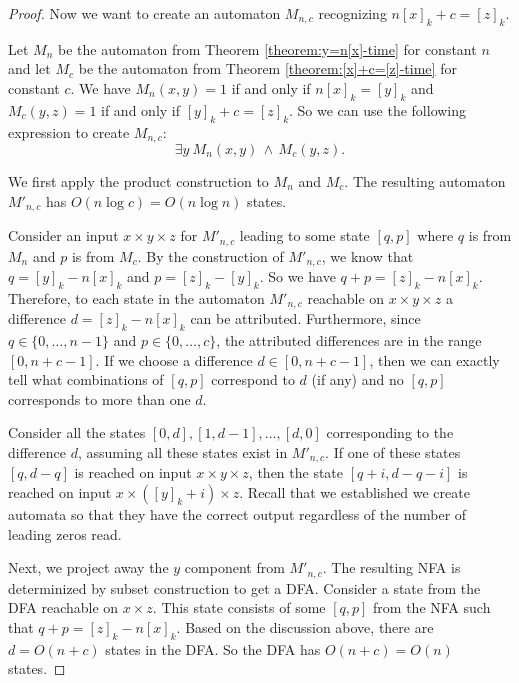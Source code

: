 \documentclass[12pt,reqno]{article}
\def\AND{\, \wedge \,}
\begin{document}
\begin{proof}
Now we want to create an automaton $M_{n, c}$ recognizing $n[x]_k + c = [z]_k$.

Let $M_n$ be the automaton from Theorem \ref{theorem:y=n[x]-time} for constant $n$ and let $M_c$ be the automaton from Theorem \ref{theorem:[x]+c=[z]-time} for constant $c$.
We have $M_n(x, y)=1$ if and only if $n[x]_k = [y]_k$ and $M_c(y, z)=1$ if and only if $[y]_k + c = [z]_k$. So we can use the following expression to create $M_{n, c}$:
\[
\exists y \  M_n(x, y)  \AND  M_c(y, z).
\]

We first apply the product construction to $M_n$ and $M_c$. The resulting automaton $M'_{n,c}$ has $O(n \log c) = O(n \log n)$ states.

Consider an input $x \times y \times z$ for $M'_{n, c}$ leading to some state $[q, p]$ where $q$ is from $M_n$ and $p$ is from $M_c$. By the construction of $M'_{n,c}$,  we know that $q=[y]_k - n[x]_k$ and $p=[z]_k - [y]_k$. So we have $q+p = [z]_k - n[x]_k$.
Therefore, to each state in the automaton $M'_{n, c}$ reachable on $x \times y \times z$ a difference $d = [z]_k - n[x]_k$ can be attributed. Furthermore, since $q \in \{0, \ldots, n-1\}$ and $p \in \{0, \ldots, c\}$, the attributed differences are in the range $[0, n+c-1]$. If we choose a difference $d \in [0, n+c-1]$, then we can exactly tell what combinations of $[q, p]$ correspond to $d$ (if any) and no $[q, p]$ corresponds to more than one $d$.

Consider all the states $[0, d], [1, d-1], \ldots, [d, 0]$ corresponding to  the difference $d$, assuming all these states exist in $M'_{n, c}$. If one of these states $[q, d-q]$ is reached on input $x \times y \times z$, then the state $[q+i, d-q-i]$ is reached on input $x \times ([y]_k+i) \times z$. Recall that we established we create automata so that they have the correct output regardless of the number of leading zeros read.

Next, we project away the $y$ component from $M'_{n, c}$.  The resulting NFA is determinized by subset construction to get a DFA.
Consider a state from the DFA reachable on $x \times z$. This state consists of some $[q, p]$ from the NFA such that $q+p = [z]_k - n[x]_k$. Based on the discussion above, there are $d=O(n+c)$ states in the DFA. So the DFA has $O(n+c) = O(n)$ states.


\end{proof}
\end{document}
